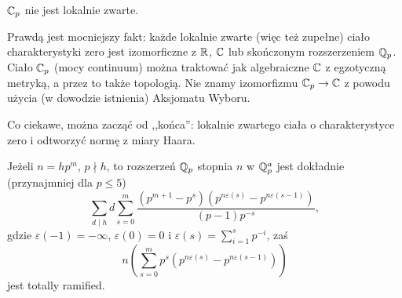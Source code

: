 \begin{fakt} %
	$\mathbb C_p$ nie jest lokalnie zwarte.
\end{fakt}


Prawdą jest mocniejszy fakt: każde lokalnie zwarte (więc też zupełne) ciało charakterystyki zero jest izomorficzne z $\mathbb R$, $\mathbb C$ lub skończonym rozszerzeniem $\mathbb Q_p$.
Ciało $\mathbb C_p$ (mocy continuum) można traktować jak algebraiczne $\mathbb C$ z egzotyczną metryką, a przez to także topologią. Nie znamy izomorfizmu $\mathbb C_p \to \mathbb C$ z powodu użycia (w dowodzie istnienia) Aksjomatu Wyboru.

Co ciekawe, można zacząć od ,,końca'': lokalnie zwartego ciała o charakterystyce zero i odtworzyć normę z miary Haara.

 	
\begin{fakt}
	Jeżeli $n = hp^m$, $p \nmid h$, to rozszerzeń $\mathbb Q_p$ stopnia $n$ w $\mathbb Q_p^a$ jest dokładnie (przynajmniej dla $p \le 5$)
	\[
		\sum_{d \mid h} d \sum_{s=0}^m  \frac{(p^{m+1}-p^{s})(p^{n \varepsilon(s)}-p^{n \varepsilon(s-1)})}{(p-1)p^{-s}},
	\]
	gdzie $\varepsilon (-1) = -\infty$, $\varepsilon(0) = 0$ i $\varepsilon(s) = \sum_{i=1}^s p^{-i}$, zaś
	\[
 		n (\sum_{s=0}^m p^s (p^{n \varepsilon(s)} - p^{n \varepsilon(s-1)})) %
	\]
	jest totally ramified.
\end{fakt}